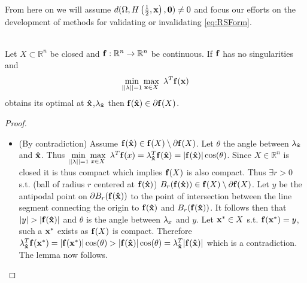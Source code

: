 From here on we will assume $d(\Omega,H\left(\frac{1}{2},\bold x\right),\bold 0)\neq 0$ and focus our efforts on the development of methods for validating or invalidating \ref{eq:RSForm}.\\



\begin{lem} \ \\
\label{lem:BdOpt}
Let $X\subset\mathbb{R}^n$ be closed and $\bold{f}:\mathbb{R}^n\rightarrow\mathbb{R}^n$ be continuous. 
If $\bold{f}$ has no singularities and $$\min\limits_{||\bold{\lambda}||=1}\max\limits_{\bold x\in X}\ \bold{\lambda}^T\bold{f}(\bold x)$$
obtains its optimal at $\bold{\hat{x}}$,$\bold{\lambda}_{\bold{\hat{x}}}$ then $\bold{f}(\bold{\hat{x}})\in \partial \bold{f}(X)$. 
\begin{proof} \ \\
\begin{itemize}
\item[](By contradiction) Assume $\bold{f}(\bold{\hat{x}})\in \bold{f}(X)\setminus\partial \bold{f}(X)$. 
Let $\theta$ the angle between $\bold{\lambda}_{\bold{\hat{x}}}$ and $\bold{\hat{x}}$. 
Thus $\min\limits_{||\bold{\lambda}||=1}\max\limits_{x\in X}\ \bold{\lambda}^T\bold{f}(x)=\bold{\lambda}_{\bold{\hat{x}}}^T\bold{f}(\bold{\hat{x}})=|\bold{f}(\bold{\hat{x}})|\cos(\theta)$. 
Since $X\in\mathbb{R}^n$ is closed it is thus compact which implies $\bold{f}(X)$ is also compact. 
Thus $\exists r>0$ s.t. (ball of radius $r$ centered at $\bold{f}(\bold{\hat{x}})$) $B_r(\bold{f}(\bold{\hat{x}}))\in \bold{f}(X)\setminus\partial \bold{f}(X)$. 
Let $y$ be the antipodal point on $\partial B_r(\bold{f}(\bold{\hat{x}}))$ to the point of intersection between the line segment connecting the origin to $\bold{f}(\bold{\hat{x}})$ and $B_r(\bold{f}(\bold{\hat{x}}))$. 
It follows then that $|y|>|\bold{f}(\bold{\hat{x}})|$ and $\theta$ is the angle between $\bold{\lambda}_x$ and $y$.   
Let $\bold{x^*}\in X$ s.t. $\bold{f}(\bold{x^*})=y$, such a $\bold{x^*}$ exists as $\bold{f}(X)$ is compact. 
Therefore $\bold{\lambda}_{\bold{\hat{x}}}^T\bold{f}(\bold{x^*})=|\bold{f}(\bold{x^*})|\cos(\theta)>|\bold{f}(\bold{\hat{x}})|\cos(\theta)=\bold{\lambda}_{\bold{\hat{x}}}^T|\bold{f}(\bold{\hat{x}})|$ which is a contradiction. 
The lemma now follows.
\end{itemize}
\end{proof}
\end{lem}

